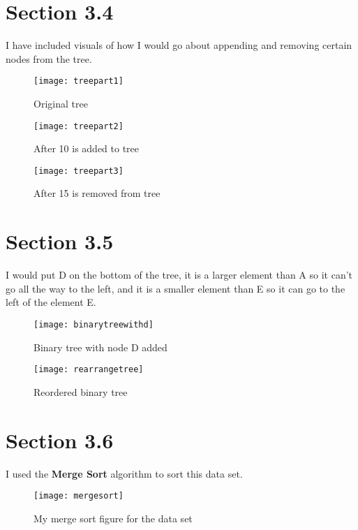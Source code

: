 \documentclass[11pt]{article}
\begin{document}
\section*{Section 3.4}
I have included visuals of how I would go about appending and removing certain nodes from the tree. 

\begin{figure}[h]
    \centering
    \texttt{[image: treepart1]}
    \caption{Original tree}
    \label{fig:my_label}
\end{figure}

\begin{figure}[h]
    \centering
    \texttt{[image: treepart2]}
    \caption{After 10 is added to tree}
    \label{fig:my_label}
\end{figure}

\begin{figure}[h]
    \centering
    \texttt{[image: treepart3]}
    \caption{After 15 is removed from tree}
    \label{fig:my_label}
\end{figure}

\section*{Section 3.5}
I would put D on the bottom of the tree, it is a larger element than A so it can't go all the way to the left, and it is a smaller element than E so it can go to the left of the element E. 
\begin{figure}[h]
    \centering
    \texttt{[image: binarytreewithd]}
    \caption{Binary tree with node D added}
    \label{fig:my_label}
\end{figure}

\begin{figure}[h]
    \centering
    \texttt{[image: rearrangetree]}
    \caption{Reordered binary tree}
    \label{fig:my_label}
\end{figure}

\newpage
\section*{Section 3.6}
I used the \textbf{Merge Sort} algorithm to sort this data set.
\begin{figure}[h]
    \centering
    \texttt{[image: mergesort]}
    \caption{My merge sort figure for the data set}
    \label{fig:my_label}
\end{figure}
\end{document}
